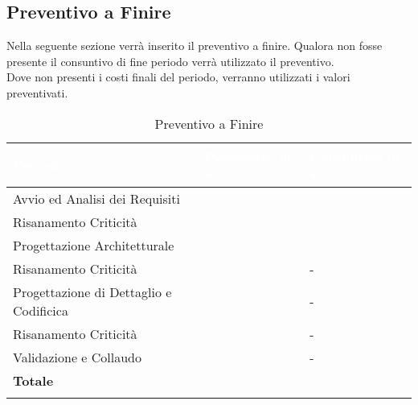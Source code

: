 \subsection{Preventivo a Finire}
\label{caption_paf}

Nella seguente sezione verrà inserito il preventivo a finire. Qualora non fosse presente il consuntivo di fine periodo verrà utilizzato il preventivo. \\
Dove non presenti i costi finali del periodo, verranno utilizzati i valori preventivati. \\

\pagebreak

\begin{longtable}{| C{.30\textwidth}| C{.15\textwidth}| C{.20\textwidth}|}
\hline
{}\textbf{\textcolor{white}{Periodo}} & \textbf{\textcolor{white}{Preventivo in \euro}} & \textbf{\textcolor{white}{Consuntivo in \euro}} \\
\hline
Avvio ed Analisi dei Requisiti &  &  \\
\hline
{}Risanamento Criticità &   &  \\
\hline
Progettazione Architetturale &  &  \\
\hline
{} Risanamento Criticità &  & - \\
\hline
Progettazione di Dettaglio e Codificica &  & - \\
\hline
{} Risanamento Criticità &   & - \\
\hline
Validazione e Collaudo &   & - \\
\hline
{}\textbf{Totale} &   &   \\
\hline
\caption{Preventivo a Finire}
\label{paf}
\end{longtable}

